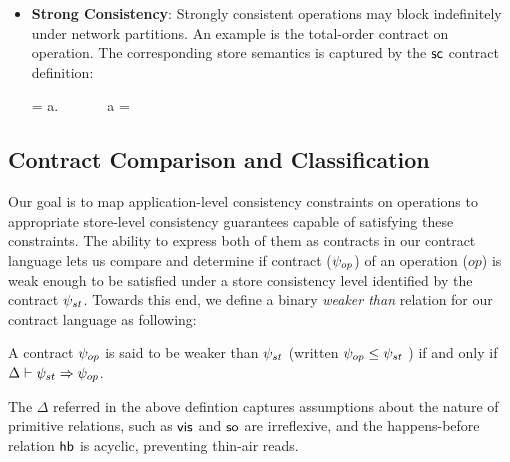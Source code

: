 \begin{itemize}
\item \textbf{Strong Consistency}: Strongly consistent operations may block
  indefinitely under network partitions. An example is the total-order
  contract on  operation. The corresponding store semantics is
  captured by the ${\sf sc}$ contract definition:

  \vspace{-1em}
  \begin{smathpar}
  \scc = \forall a.~ \Rightarrow {} ~\vee~  ~\vee~ a = \cureff
  \end{smathpar}

\end{itemize}





\subsection{Contract Comparison and Classification}

Our goal is to map application-level consistency constraints on
operations to appropriate store-level consistency guarantees capable
of satisfying these constraints.  The ability to express both of them as
contracts in our contract language lets us compare and determine if
contract ($\psi_{op}$) of an operation ($op$) is weak enough to be
satisfied under a store consistency level identified by the contract
$\psi_{st}$. Towards this end, we define a binary \emph{weaker than}
relation for our contract language as following:

\begin{definition}
A contract $\psi_{op}$ is said to be weaker than $\psi_{st}$ (written $\psi_{op}
\le \psi_{st}$ ) if and only if $\Delta \vdash \psi_{st} \Rightarrow \psi_{op}$.
\begin{center}
\end{center}
\end{definition}

\vspace{-1em}
\noindent The $\Delta$ referred in the above defintion captures
assumptions about the nature of primitive relations, such as ${\normalfont \textsf{vis}}$
and ${\normalfont \textsf{so}}$ are irreflexive, and the happens-before relation ${\normalfont \textsf{hb}}$ is
acyclic, preventing thin-air reads.


